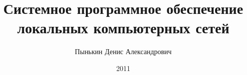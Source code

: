 \documentclass[12pt,a4paper,oneside]{book}
\begin{document}
\title{Системное программное обеспечение локальных компьютерных сетей}
\author{Пынькин Денис Александрович}
\date{2011}
\maketitle

\renewcommand{\contentsname}{Оглавление}

\tableofcontents
\setcounter{tocdepth}{2}
\newpage



%





\end{document}
